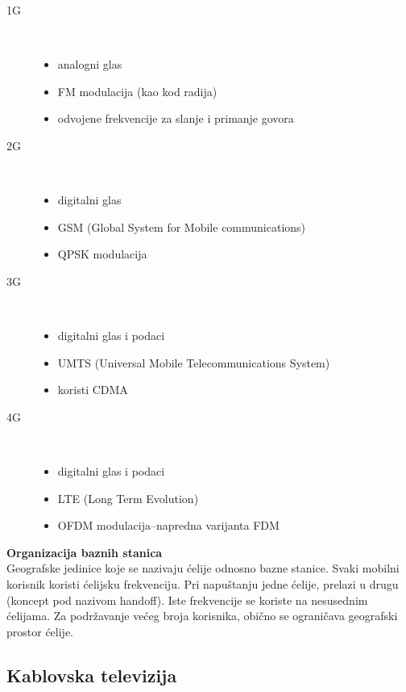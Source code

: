\documentclass{article} %
\begin{document}
\begin{description}
	\item[1G] ~
	\begin{itemize}
		\item analogni glas
		\item FM modulacija (kao kod radija)
		\item odvojene frekvencije za slanje i primanje govora
	\end{itemize}
	
	\item[2G] ~ 
	\begin{itemize}
		\item digitalni glas
		\item GSM (Global System for Mobile communications)
		\item QPSK modulacija
	\end{itemize}

	\item[3G] ~
	\begin{itemize}
		\item digitalni glas i podaci
		\item UMTS (Universal Mobile Telecommunications System)
		\item koristi CDMA
	\end{itemize}

	\item[4G] ~
	\begin{itemize}
		\item digitalni glas i podaci
		\item LTE (Long Term Evolution)
		\item OFDM modulacija–napredna varijanta FDM
	\end{itemize}
\end{description}

\noindent\textbf{Organizacija baznih stanica}
\\ Geografske jedinice koje se nazivaju \' celije odnosno bazne stanice. Svaki mobilni korisnik koristi \' celijsku frekvenciju. Pri napu\v stanju jedne \' celije, prelazi u drugu (koncept pod nazivom handoff). Iste frekvencije se koriste na nesusednim \' celijama. Za podr\v zavanje ve\' ceg broja korisnika, obi\v cno se ograni\v cava geografski prostor \' celije.

\subsection{Kablovska televizija}
\end{document}
